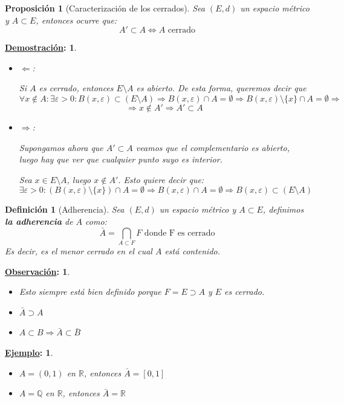 \documentclass[10pt,a4paper,openright]{book}
\theoremstyle{break}
\newtheorem*{defi}{Definición}
\newtheorem*{prop}{Proposición}
\newtheorem*{demo}{\underline{Demostración}:}
\newtheorem*{obs}{\underline{Observación}:}
\newtheorem*{ej}{\underline{Ejemplo}:}
\begin{document}
\begin{prop}[Caracterización de los cerrados]
Sea $(E,d)$ un espacio métrico y $A\subset E$, entonces ocurre que:
$$A'\subset A \Leftrightarrow A \mbox{ cerrado}$$
\end{prop}
\begin{demo}
\begin{itemize}
\item $\Leftarrow$:

Si $A$ es cerrado, entonces $E\setminus A$ es abierto. De esta forma, queremos decir que
$$\forall x \notin A : \exists \varepsilon > 0 : B(x,\varepsilon)\subset (E\setminus A) \Rightarrow B(x,\varepsilon) \cap A = \emptyset \Rightarrow B(x,\varepsilon)\setminus \{x\} \cap A = \emptyset \Rightarrow$$
$$\Rightarrow x \notin A' \Rightarrow A' \subset A$$

\item $\Rightarrow$:

Supongamos ahora que $A'\subset A$ veamos que el complementario es abierto, luego hay que ver que cualquier punto suyo es interior.

Sea $x\in E\setminus A$, luego $x\notin A'$. Esto quiere decir que:
$$\exists \varepsilon > 0 : \left(B(x,\varepsilon)\setminus\{x\}\right)\cap A = \emptyset \Rightarrow B(x,\varepsilon)\cap A = \emptyset \Rightarrow B(x,\varepsilon)\subset (E\setminus A)$$
\end{itemize}
\end{demo}

\begin{defi}[Adherencia]
Sea $(E,d)$ un espacio métrico y $A \subset E$, definimos \textbf{la adherencia} de $A$ como:
$$\bar{A} = \bigcap_{A\subset F } F \mbox{ donde F es cerrado}$$
Es decir, es el menor cerrado en el cual $A$ está contenido.
\end{defi}

\begin{obs}
\begin{itemize}
\item Esto siempre está bien definido porque $F=E\supset A$ y $E$ es cerrado.
\item $\bar{A}\supset A$
\item $A\subset B\Rightarrow \bar{A}\subset \bar{B}$
\end{itemize}
\end{obs}

\begin{ej}
\begin{itemize}
\item $A = (0,1)$ en $\mathbb{R}$, entonces $\bar{A} = [0,1]$
\item $A = \mathbb{Q}$ en $\mathbb{R}$, entonces $\bar{A} = \mathbb{R}$
\end{itemize}
\end{ej}
\end{document}
